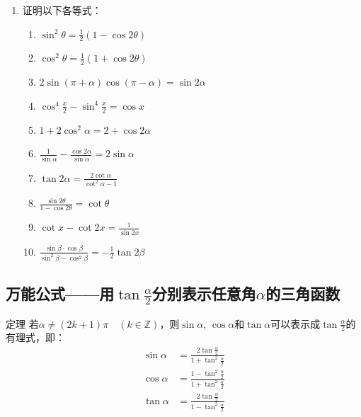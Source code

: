 \begin{ex}
\begin{enumerate}
\item 证明以下各等式：
\begin{enumerate}
    \item $\sin^2\theta=\frac{1}{2}(1-\cos2\theta)$
    \item $\cos^2\theta=\frac{1}{2}(1+\cos2\theta)$
    \item $2\sin(\pi+\alpha)\cos(\pi-\alpha)=\sin2\alpha$
    \item $\cos^4\frac{x}{2}-\sin^4\frac{x}{2}=\cos x$
    \item $1+2\cos^2\alpha=2+\cos2\alpha$
    \item $\frac{1}{\sin\alpha}-\frac{\cos2\alpha}{\sin\alpha}=2\sin\alpha$
    \item $\tan2\alpha=\frac{2\cot\alpha}{\cot^2\alpha-1}$
    \item $\frac{\sin2\theta}{1-\cos2\theta}=\cot\theta$
    \item $\cot x-\cot2x=\frac{1}{\sin 2x}$
    \item $\frac{\sin\beta\cdot \cos\beta}{\sin^2\beta-\cos^2\beta}=-\frac{1}{2}\tan2\beta$
\end{enumerate}
\end{enumerate}    


\end{ex}

\subsection{万能公式——用$\tan\frac{\alpha}{2}$分别表示任意角$\alpha$的三角函数}

\begin{blk}{定理}
若$\alpha\ne (2k+1)\pi\quad (k\in\mathbb{Z})$，则$\sin\alpha$, $\cos\alpha$和$\tan\alpha$可以表示成$\tan\frac{\alpha}{2}$的有理式，即：
\begin{align}
\sin\alpha &=\frac{2\tan\frac{\alpha}{2}}{1+\tan^2\frac{\alpha}{2}}\\
\cos\alpha&=\frac{1-\tan^2\frac{\alpha}{2}}{1+\tan^2\frac{\alpha}{2}}\\
\tan\alpha&=\frac{2\tan\frac{\alpha}{2}}{1-\tan^2\frac{\alpha}{2}}
\end{align}
\end{blk}

